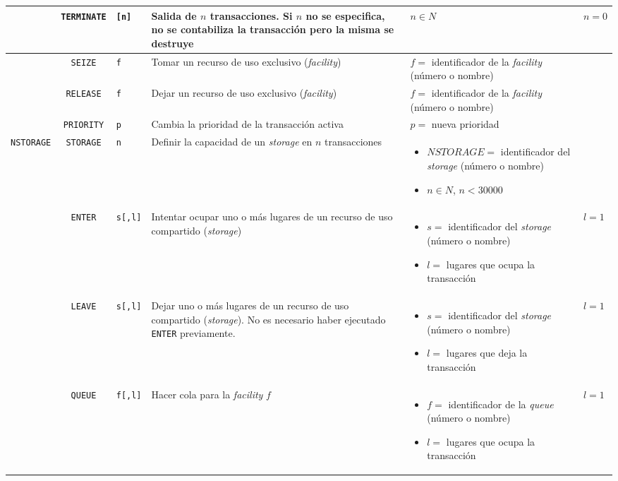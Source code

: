 \documentclass{article}
\providecommand{\tabularnewline}{\\}
\begin{document}
\begin{longtable}{|lc>{\raggedright}p{}|>{\raggedright}p{}|>{\raggedright}p{}|>{\raggedright}p{}|}
\hline
& \texttt{TERMINATE} & \texttt{[n]} &
Salida de $n$ transacciones. Si $n$ no se especifica, no se contabiliza la transacción pero la misma se destruye &
$n \in N$ & $n=0$ \tabularnewline

\hline
\pagebreak

\hline
& \texttt{SEIZE} & \texttt{f} &
Tomar un recurso de uso exclusivo (\emph{facility}) &
$f=$ identificador de la \emph{facility} (número o nombre) & \tabularnewline

\hline
& \texttt{RELEASE} & \texttt{f} &
Dejar un recurso de uso exclusivo (\emph{facility}) &
$f=$ identificador de la \emph{facility} (número o nombre) & \tabularnewline

\hline
& \texttt{PRIORITY} & \texttt{p} &
Cambia la prioridad de la transacción activa & $p=$ nueva prioridad & \tabularnewline

\hline
\texttt{NSTORAGE} & \texttt{STORAGE} & \texttt{n} &
Definir la capacidad de un \emph{storage} en $n$ transacciones &
\begin{itemize}
  \item $NSTORAGE=$ identificador del \emph{storage} (número o nombre)
  \item $n \in N$, $n < 30000$
\end{itemize} & \tabularnewline

\hline
& \texttt{ENTER} & \texttt{s[,l]} &
Intentar ocupar uno o más lugares de un recurso de uso compartido (\emph{storage}) &
\begin{itemize}
  \item $s=$ identificador del \emph{storage} (número o nombre)
  \item $l=$ lugares que ocupa la transacción
\end{itemize} &
$l=1$ \tabularnewline

\hline
& \texttt{LEAVE} & \texttt{s[,l]} &
Dejar uno o más lugares de un recurso de uso compartido (\emph{storage}).
No es necesario haber ejecutado \texttt{ENTER} previamente. &
\begin{itemize}
  \item $s=$ identificador del \emph{storage} (número o nombre)
  \item $l=$ lugares que deja la transacción
\end{itemize} &
$l=1$ \tabularnewline

\hline
& \texttt{QUEUE} & \texttt{f[,l]} &
Hacer cola para la \emph{facility} $f$ &
\begin{itemize}
  \item $f=$ identificador de la \emph{queue} (número o nombre)
  \item $l=$ lugares que ocupa la transacción
\end{itemize} &
$l=1$ \tabularnewline


\end{longtable}
\end{document}

